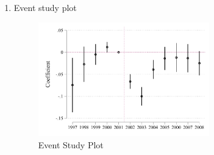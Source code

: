 \documentclass{article}
\begin{document}
\begin{enumerate}
\item Event study plot
\begin{figure}[H]
    \centering
    \includegraphics[width=0.7\textwidth]{./figure/eventstudy.pdf}
    \caption{Event Study Plot}
    \label{f:event} 
\end{figure}


\end{enumerate}
\end{document}
